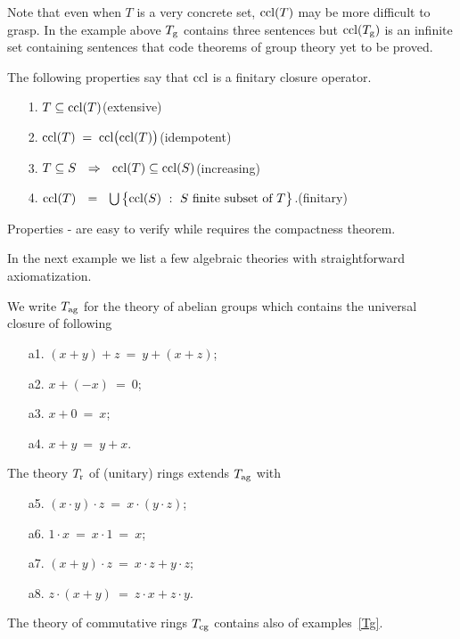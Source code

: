 Note that even when $T$ is a very concrete set, ${\rm ccl}(T)$ may be more difficult to grasp.
In the example above $T_{\rm g}$ contains three sentences but ${\rm ccl}(T_{\rm g})$ is an infinite set containing sentences that code theorems of group theory yet to be proved.

\begin{remark}
The following properties say that ${\rm ccl}$ is a finitary closure operator.
\begin{itemize}
\item[1.] $T\subseteq{\rm ccl}(T)$\hfill (extensive)
\item[2.] ${\rm ccl}(T)\;=\;{\rm ccl}\big({\rm ccl}(T)\big)$\hfill(idempotent)
\item[3.] $T\subseteq S\ \ \IMP\ \ \ccl(T)\subseteq\ccl(S)$\hfill (increasing) 
\item[4.] ${\rm ccl}(T)\ \ =\ \ \bigcup\big\{{\rm ccl}(S)\ :\ S \textrm{ finite subset of } T\big\}$.\hfill (finitary)
\end{itemize}
Properties - are easy to verify while  requires the compactness theorem.
\end{remark}

In the next example we list a few algebraic theories with straightforward axiomatization.

\begin{example}
We write $T_{\rm ag}$ for the theory of abelian groups which contains the universal closure of following
\begin{itemize}
\item[a1.] $(x+y) +z\ =\ y+(x+z)$;
\item[a2.] $x+(-x)\ =\ 0$;
\item[a3.] $x+0\ = \ x$;
\item[a4.] $x+y\ =\ y+x$.
\end{itemize}
\end{example}

\begin{example}
The theory $T_{\rm r}$ of (unitary) rings extends $T_{\rm ag}$ with
\begin{itemize}
\item[a5.] $(x\cdot  y)\cdot  z\  =\ x\cdot (y\cdot  z)$;
\item[a6.] $1\cdot  x\ =\ x\cdot  1\ =\ x$;
\item[a7.] $(x+y)\cdot  z\ =\ x\cdot  z + y\cdot  z$;
\item[a8.] $z\cdot  (x+y)\ =\ z\cdot  x + z\cdot  y$.
\end{itemize}
The theory of commutative rings $T_{\rm cg}$ contains also  of examples~\ref{Tg}.
\end{example}

